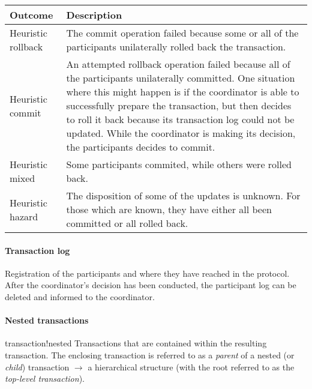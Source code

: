 \hskip-0.5cm
\begin{tabularx}{\linewidth}{p{1.5cm} X}
	Outcome & Description \\
	\hline
	Heuristic rollback & The commit operation failed because some or all of the participants unilaterally rolled back the transaction. \\
  Heuristic commit & An attempted rollback operation failed because all of the participants unilaterally committed. One situation where this might happen is if the coordinator is able to successfully prepare the transaction, but then decides to roll it back because its transaction log could not be updated. While the coordinator is making its decision, the participants decides to commit. \\
  Heuristic mixed & Some participants commited, while others were rolled back.\\
  Heuristic hazard & The disposition of some of the updates is unknown. For those which are known, they have either all been committed or all rolled back.\\
\end{tabularx}


\paragraph{Transaction log} Registration of the participants and where they have reached in the protocol. After the coordinator's decision has been conducted, the participant log can be deleted and informed to the coordinator.

\paragraph{Nested transactions}{transaction!nested} Transactions that are contained within the resulting transaction. The enclosing transaction is referred to as a \textit{parent} of a nested (or \textit{child}) transaction $\rightarrow$ a hierarchical structure (with the root referred to as the \textit{top-level transaction}).

